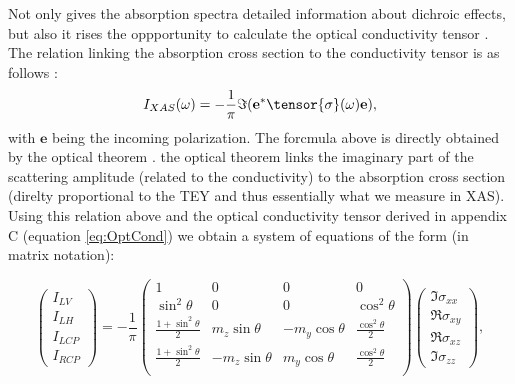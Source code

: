 \documentclass[twocolumn,amsmath,superscriptaddress,amssymb]{revtex4-1}
\let\vec\mathbf
\begin{document}
%
\indent  Not only gives the absorption spectra detailed information about dichroic effects, but also it rises the oppportunity to calculate the optical conductivity tensor \cite{Haverkort}. The relation linking the absorption cross section to the conductivity tensor is as follows \cite{Ament2018}:
%
\begin{equation}
I_{XAS}(\omega)= -\frac{1}{\pi} \Im(\vec{e}^*\tensor{\sigma}(\omega)\vec{e}),
\end{equation}
%
with $\vec{e}$ being the incoming polarization. The forcmula above is directly obtained by the optical theorem \cite{Newton}. the optical theorem links the imaginary part of the scattering amplitude (related to the conductivity) to the absorption cross section (direlty proportional to the TEY and thus essentially what we measure in XAS). Using this relation above and the optical conductivity tensor derived in appendix C (equation \ref{eq:OptCond}) we obtain a system of equations of the form (in matrix notation):
\begin{widetext}
\begin{equation}
\left(\begin{array}{c}
I_{LV} \\ I_{LH} \\ I_{LCP} \\ I_{RCP}
\end{array}\right)=-\frac{1}{\pi}\left(
\begin{array}{cccc}
1&0&0&0\\
\sin^2\theta&0&0&\cos^2\theta\\
\frac{1+\sin^2\theta}{2}&m_z\sin\theta&-m_y\cos\theta&\frac{\cos^2\theta}{2}\\
\frac{1+\sin^2\theta}{2}&-m_z\sin\theta&m_y\cos\theta&\frac{\cos^2\theta}{2}\\
\end{array}\right)\left(
\begin{array}{c}
\Im\sigma_{xx}\\ \Re\sigma_{xy}\\ \Re\sigma_{xz}\\ \Im\sigma_{zz}
\end{array}\right),
\end{equation}
\end{widetext}
\end{document}
